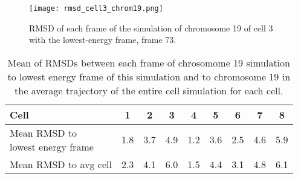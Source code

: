 \begin{figure}[ht]
\centering
  \texttt{[image: rmsd\_cell3\_chrom19.png]}
  \caption{RMSD of each frame of the simulation of chromosome 19 of cell 3 with the lowest-energy frame, frame 73.}
  \label{fig:rmsd_cell3_chrom19}
\end{figure}

\begin{table}[ht]
\centering
  \caption{Mean of RMSDs between each frame of chrosomome 19 simulation to lowest energy frame of this simulation and to chromosome 19 in the average trajectory of the entire cell simulation for each cell.}
  \label{tab:chrom19_mean_rmsds}
  \begin{tabular}{l @{\phantom{abc}} S S S S S S S S}
  \toprule
    Cell & 1 & 2 & 3 & 4 & 5 & 6 & 7 & 8 \\
  \midrule
    \parbox{4cm}{Mean RMSD to \\ lowest energy frame} & 1.8 & 3.7 & 4.9 & 1.2 & 3.6 & 2.5 & 4.6 & 5.9 \\
    Mean RMSD to avg cell & 2.3 & 4.1 & 6.0 & 1.5 & 4.4 & 3.1 & 4.8 & 6.1 \\
  \bottomrule
  \end{tabular}
\end{table}




